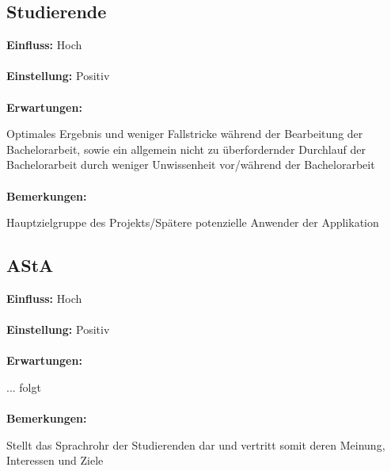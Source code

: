 \documentclass{scrreprt}
\begin{document}
\subsection{Studierende}
\textbf{Einfluss:} Hoch\\\\
\textbf{Einstellung:} Positiv\\\\
\textbf{Erwartungen:}\par Optimales Ergebnis und weniger \glqq Fallstricke\grqq{} während der Bearbeitung der Bachelorarbeit, sowie ein allgemein \glqq nicht zu überfordernder\grqq{} Durchlauf der Bachelorarbeit durch weniger Unwissenheit vor/während der Bachelorarbeit\\\\
\textbf{Bemerkungen:}\par Hauptzielgruppe des Projekts/Spätere potenzielle Anwender der Applikation

\subsection{AStA}
\textbf{Einfluss:} Hoch\\\\
\textbf{Einstellung:} Positiv\\\\
\textbf{Erwartungen:}\par ... folgt\\\\
\textbf{Bemerkungen:}\par Stellt das Sprachrohr der Studierenden dar und vertritt somit deren Meinung, Interessen und Ziele
\newpage
\end{document}

